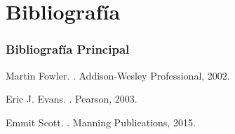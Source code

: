 \documentclass[a4paper,t,xcolor=pst,dvips,colortheme]{beamer}
\begin{document}
\section{Bibliografía}

\begin{frame}[c]
	\frametitle{Bibliografía Principal}
    \begin{thebibliography}{1}

Martin Fowler.
.
\newblock Addison-Wesley Professional, 2002.

Eric J. Evans.
.
\newblock Pearson, 2003.

\bibitem{}
Emmit Scott.
.
\newblock  Manning Publications, 2015.


\end{thebibliography}
\end{frame}
\end{document}
